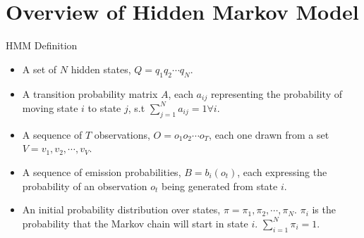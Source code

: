 \documentclass{beamer}
\begin{document}
\section{Overview of Hidden Markov Model}
\begin{frame}{HMM Definition}
	\begin{itemize}
		\item A set of $N$  hidden states, $ Q = q_1 q_2\cdots q_N.$
		\item A transition probability matrix $A$, each $a_{ij}$ representing the probability of moving state $i$ to state $j$, s.t $\sum_{j=1}^{N} a_{ij} = 1 \forall i$.
		\item A sequence of $T$ observations, $ O = o_1 o_2\cdots o_T$, each one drawn from a set $V = v_1, v_2, \cdots, v_V$.
		\item A sequence of emission probabilities, $B = b_i(o_t)$,  each expressing the probability of an observation $o_t$ being generated from state $i$.
		\item An initial probability distribution over states, $\pi = \pi_1, \pi_2,\cdots, \pi_N$. $\pi_i$ is the probability that the Markov chain will start in state $i$. $\sum_{i=1}^{N} \pi_i = 1$.
	\end{itemize}
\end{frame}
\end{document}
